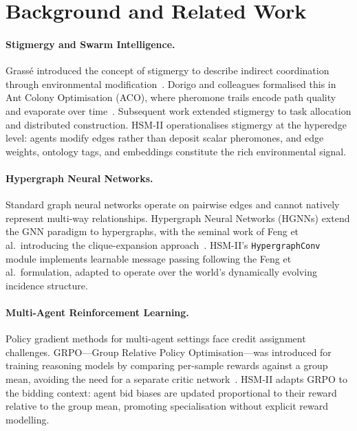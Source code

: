 \documentclass[11pt]{article}
\begin{document}
\section{Background and Related Work}
\label{sec:related}

\paragraph{Stigmergy and Swarm Intelligence.}
Grass\'e introduced the concept of stigmergy to describe indirect coordination
through environmental modification~\cite{grasse1959}. Dorigo and colleagues
formalised this in Ant Colony Optimisation (ACO), where pheromone trails encode
path quality and evaporate over time~\cite{dorigo1996}. Subsequent work extended
stigmergy to task allocation and distributed construction. HSM-II operationalises
stigmergy at the hyperedge level: agents modify edges rather than deposit scalar
pheromones, and edge weights, ontology tags, and embeddings constitute the rich
environmental signal.

\paragraph{Hypergraph Neural Networks.}
Standard graph neural networks operate on pairwise edges and cannot natively
represent multi-way relationships. Hypergraph Neural Networks (HGNNs) extend the
GNN paradigm to hypergraphs, with the seminal work of Feng et al.\ introducing
the clique-expansion approach~\cite{bronstein2021geometric}. HSM-II's
\texttt{HypergraphConv} module implements learnable message passing following the
Feng et al.\ formulation, adapted to operate over the world's dynamically evolving
incidence structure.

\paragraph{Multi-Agent Reinforcement Learning.}
Policy gradient methods for multi-agent settings face credit assignment
challenges. GRPO---Group Relative Policy Optimisation---was introduced for training
reasoning models by comparing per-sample rewards against a group mean,
avoiding the need for a separate critic network~\cite{shao2024grpo}. HSM-II adapts
GRPO to the bidding context: agent bid biases are updated proportional to their
reward relative to the group mean, promoting specialisation without explicit reward
modelling.
\end{document}
